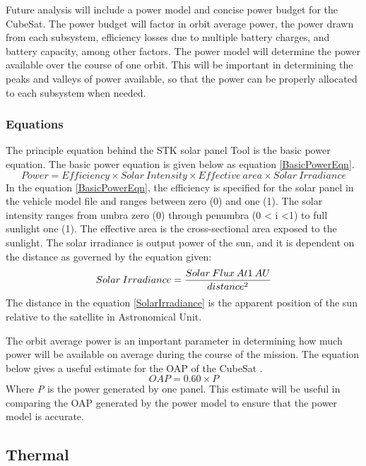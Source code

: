 Future analysis will include a power model and concise power budget for the CubeSat. The power budget will factor in orbit average power, the power drawn from each subsystem, efficiency losses due to multiple battery charges, and battery capacity, among other factors. The power model will determine the power available over the course of one orbit. This will be important in determining the peaks and valleys of power available, so that the power can be properly allocated to each subsystem when needed. 
\subsubsection{Equations}
The principle equation behind the STK solar panel Tool is the basic power equation\cite{STK_SPT}. The basic power equation is given below as equation \ref{BasicPowerEqn}.
\begin{equation}
Power = Efficiency \times Solar \:Intensity \times Effective \:area \times Solar \:Irradiance
\label{BasicPowerEqn}
\end{equation}
In the equation \ref{BasicPowerEqn}, the efficiency is specified for the solar panel in the vehicle model file and ranges between zero (0) and one (1). The solar intensity ranges from umbra zero (0) through penumbra (0 < i <1) to full sunlight one (1). The effective area is the cross-sectional area exposed to the sunlight. The solar irradiance is output power of the sun, and it is dependent on the distance as governed by the equation given:
\begin{equation}
Solar \:Irradiance = \frac{Solar \:Flux \:At 1 \:AU}{distance\textsuperscript{2}}
\label{SolarIrradiance}
\end{equation}
The distance in the equation \ref{SolarIrradiance} is the apparent position of the sun relative to the satellite in Astronomical Unit\cite{STK_SPT}.

The orbit average power is an important parameter in determining how much power will be available on average during the course of the mission. The equation below gives a useful estimate for the OAP of the CubeSat \cite{budget}. 
\begin{equation}
OAP = 0.60 \times P
\end{equation}
Where \textit{P} is the power generated by one panel. This estimate will be useful in comparing the OAP generated by the power model to ensure that the power model is accurate. 

\subsection{Thermal}

